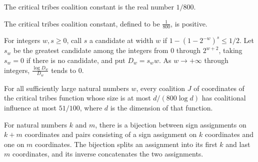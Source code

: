 \begin{definition}
\label{FABL.criticalTribesCoalitionConstant}
\leanok
The critical tribes coalition constant is the real number $1/800$.
\end{definition}

\begin{theorem}
\label{FABL.criticalTribesCoalitionConstant_pos}
\leanok
{}
The critical tribes coalition constant, defined to be $\frac{1}{800}$, is positive.
\end{theorem}

\begin{theorem}
\label{FABL.tendsto_log_tribesCriticalDimension_div_dimension_zero}
\leanok
{}
For integers $w,s\geq0$, call $s$ a candidate at width $w$ if $1-(1-2^{-w})^s\leq 1/2$.
Let $s_w$ be the greatest candidate among the integers from $0$ through $2^{w+2}$,
taking $s_w=0$ if there is no candidate, and put $D_w=s_w w$. As $w\to+\infty$ through
integers, $\frac{\log D_w}{D_w}$ tends to $0$.
\end{theorem}

\begin{theorem}
\label{FABL.eventually_criticalTribes_coalitionalInfluence_le_fiftyOnePercent}
\leanok
{}
For all sufficiently large natural numbers $w$, every coalition $J$ of coordinates of
the critical tribes function whose size is at most $d/(800\log d)$ has coalitional
influence at most $51/100$, where $d$ is the dimension of that function.
\end{theorem}

\begin{definition}
\label{FABL.majorityCoalitionSplitEquiv}
\leanok
{}
For natural numbers $k$ and $m$, there is a bijection between sign assignments on $k+m$
coordinates and pairs consisting of a sign assignment on $k$ coordinates and one on $m$
coordinates. The bijection splits an assignment into its first $k$ and last $m$
coordinates, and its inverse concatenates the two assignments.
\end{definition}

